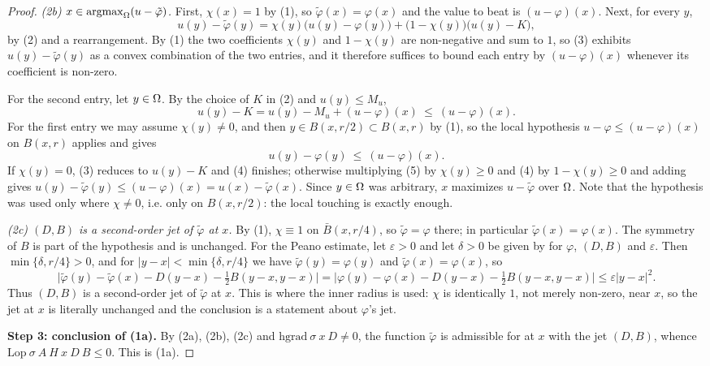 \begin{proof}
\emph{(2b) $x\in\operatorname*{argmax}_\Omega(u-\tilde\varphi)$.} First, $\chi(x)=1$ by (1), so
$\tilde\varphi(x)=\varphi(x)$ and the value to beat is $(u-\varphi)(x)$. Next, for every
$y$,
\[
 u(y)-\tilde\varphi(y)=\chi(y)\big(u(y)-\varphi(y)\big)+\big(1-\chi(y)\big)\big(u(y)-K\big),
 \tag{3}
\]
by (2) and a rearrangement. By (1) the two coefficients $\chi(y)$ and $1-\chi(y)$ are
non-negative and sum to $1$, so (3) exhibits $u(y)-\tilde\varphi(y)$ as a convex
combination of the two entries, and it therefore suffices to bound each entry by
$(u-\varphi)(x)$ whenever its coefficient is non-zero.

For the second entry, let $y\in\Omega$. By the choice of $K$ in (2) and $u(y)\le M_u$,
\[
 u(y)-K=u(y)-M_u+(u-\varphi)(x)\ \le\ (u-\varphi)(x). \tag{4}
\]
For the first entry we may assume $\chi(y)\ne0$, and then $y\in B(x,r/2)\subset B(x,r)$ by
(1), so the local hypothesis $u-\varphi\le(u-\varphi)(x)$ on $B(x,r)$ applies and gives
\[
 u(y)-\varphi(y)\ \le\ (u-\varphi)(x). \tag{5}
\]
If $\chi(y)=0$, (3) reduces to $u(y)-K$ and (4) finishes; otherwise multiplying (5) by
$\chi(y)\ge0$ and (4) by $1-\chi(y)\ge0$ and adding gives
$u(y)-\tilde\varphi(y)\le(u-\varphi)(x)=u(x)-\tilde\varphi(x)$. Since $y\in\Omega$ was
arbitrary, $x$ maximizes $u-\tilde\varphi$ over $\Omega$. Note that the hypothesis was used
only where $\chi\ne0$, i.e. only on $B(x,r/2)$: the local touching is exactly enough.

\emph{(2c) $(D,B)$ is a second-order jet of $\tilde\varphi$ at $x$.} By (1),
$\chi\equiv1$ on $\bar B(x,r/4)$, so $\tilde\varphi=\varphi$ there; in particular
$\tilde\varphi(x)=\varphi(x)$. The symmetry of $B$ is part of the hypothesis and is
unchanged. For the Peano estimate, let $\varepsilon>0$ and let $\delta>0$ be given by
 for $\varphi$, $(D,B)$ and $\varepsilon$. Then
$\min\{\delta,r/4\}>0$, and for $|y-x|<\min\{\delta,r/4\}$ we have $\tilde\varphi(y)=\varphi(y)$
and $\tilde\varphi(x)=\varphi(x)$, so
\[
 \Big|\tilde\varphi(y)-\tilde\varphi(x)-D(y-x)-\tfrac12B(y-x,y-x)\Big|
 =\Big|\varphi(y)-\varphi(x)-D(y-x)-\tfrac12B(y-x,y-x)\Big|\le\varepsilon|y-x|^{2}.
\]
Thus $(D,B)$ is a second-order jet of $\tilde\varphi$ at $x$. This is where the inner
radius is used: $\chi$ is identically $1$, not merely non-zero, near $x$, so the jet at $x$
is literally unchanged and the conclusion is a statement about $\varphi$'s jet.

\medskip\noindent\textbf{Step 3: conclusion of (1a).} By (2a), (2b), (2c) and
$\mathrm{hgrad}\ \sigma\ x\ D\ne0$, the function $\tilde\varphi$ is admissible for
 at $x$ with the jet $(D,B)$, whence
$\mathrm{Lop}\ \sigma\ A\ H\ x\ D\ B\le0$. This is (1a).


\end{proof}
